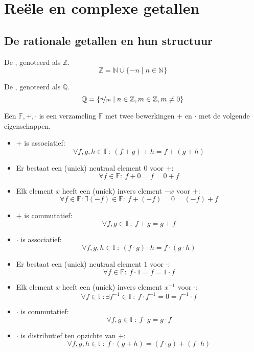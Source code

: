 \documentclass[main.tex]{subfiles}
\begin{document}
\chapter{Re\"ele en complexe getallen}
\label{cha:reele-en-complexe-getallen}

\section{De rationale getallen en hun structuur}
\label{sec:de-rati-getall}

\begin{de}
  De , genoteerd als $\mathbb{Z}$.
  \[ \mathbb{Z} = \mathbb{N} \cup \{ -n \mid n\in \mathbb{N} \}  \]
\end{de}

\begin{de}
  De , genoteerd als $\mathbb{Q}$.
  \[ \mathbb{Q} = \{ \nicefrac{n}{m} \mid n\in \mathbb{Z}, m\in \mathbb{Z}, m \neq 0 \} \]
\end{de}


\begin{de}
  Een  $\mathbb{F},+,\cdot$ is een verzameling $\mathbb{F}$ met twee bewerkingen $+$ en $\cdot$ met de volgende eigenschappen.
  \begin{itemize}
  \item $+$ is associatief:
    \[ \forall f,g,h \in \mathbb{F}:\ (f+g)+h = f+(g+h) \]
  \item Er bestaat een (uniek) neutraal element $0$ voor $+$:
    \[ \forall f\in \mathbb{F}:\ f + 0 = f = 0 + f \]
  \item Elk element $x$ heeft een (uniek) invers element $-x$ voor $+$:
    \[ \forall f\in \mathbb{F}: \exists (-f) \in \mathbb{F}: \ f + (-f) = 0 = (-f) + f \]
  \item $+$ is commutatief:
    \[ \forall f,g \in \mathbb{F}:\ f+g = g+f \]
  \item $\cdot$ is associatief:
    \[ \forall f,g,h \in \mathbb{F}:\ (f\cdot g) \cdot h = f\cdot (g\cdot h) \]
  \item Er bestaat een (uniek) neutraal element $1$ voor $\cdot$:
    \[ \forall f\in \mathbb{F}:\ f \cdot 1 = f = 1 \cdot f \]
  \item Elk element $x$ heeft een (uniek) invers element $x^{-1}$ voor $\cdot$:
    \[ \forall f\in \mathbb{F}: \exists f^{-1} \in \mathbb{F}: \ f \cdot f^{-1} = 0 = f^{-1} \cdot f \]
  \item $\cdot$ is commutatief:
    \[ \forall f,g \in \mathbb{F}:\ f\cdot g = g \cdot f \]
  \item $\cdot$ is distributief ten opzichte van $+$:
    \[ \forall f,g,h \in \mathbb{F}:\ f \cdot (g+h) = (f \cdot g) + (f \cdot h) \]
  \end{itemize}
\end{de}
\end{document}
